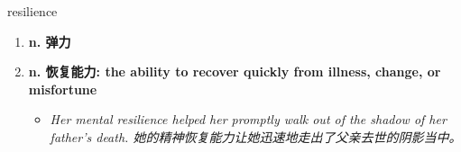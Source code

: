 
\begin{frame}
{\huge resilience}
\begin{center}
\begin{enumerate}\Large
  \item \textbf{n. 弹力}
  \item \textbf{n. 恢复能力: the ability to recover quickly from illness, change, or misfortune}
  \begin{itemize}
    \item \em{\Large{Her mental resilience helped her promptly walk out of the shadow of her father’s death. 她的精神恢复能力让她迅速地走出了父亲去世的阴影当中。}}
  \end{itemize}
\end{enumerate}
\end{center}
\end{frame}
